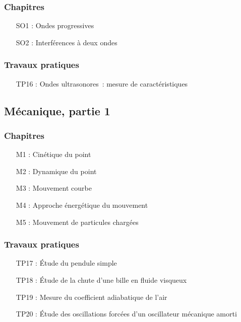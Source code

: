 \documentclass[a4paper, 10pt, final, garamond]{book}
\begin{document}
\begin{multicols}{2}
	\subsubsection{Chapitres}

	\begin{itemize}[label=$\diamond$]
		\item[SO1]: Ondes progressives
		\item[SO2]: Interférences à deux ondes
	\end{itemize}

	\columnbreak

	\subsubsection{Travaux pratiques}

	\begin{itemize}[label=$\diamond$]
		\item[TP16]: Ondes ultrasonores~: mesure de caractéristiques
	\end{itemize}
\end{multicols}

\subsection{Mécanique, partie 1}

\begin{multicols}{2}
	\subsubsection{Chapitres}

	\begin{itemize}[label=$\diamond$]
		\item[M1]: Cinétique du point
		\item[M2]: Dynamique du point
		\item[M3]: Mouvement courbe
		\item[M4]: Approche énergétique du mouvement
		\item[M5]: Mouvement de particules chargées
	\end{itemize}

	\columnbreak

	\subsubsection{Travaux pratiques}

	\begin{itemize}[label=$\diamond$]
		\item[TP17]: Étude du pendule simple
		\item[TP18]: Étude de la chute d'une bille en fluide visqueux
		\item[TP19]: Mesure du coefficient adiabatique de l'air
		\item[TP20]: Étude des oscillations forcées d'un oscillateur mécanique amorti
	\end{itemize}
\end{multicols}
\end{document}
